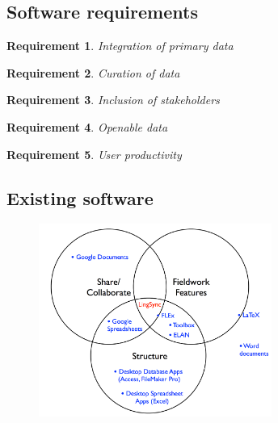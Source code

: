 \documentclass{beamer}
\newtheorem{requirement}{Requirement}
\begin{document}
\subsection[Requirements]{Software requirements}

\begin{frame}


\begin{requirement}
\label{req:primary-data}
Integration of primary data
\end{requirement}


\begin{requirement}
\label{req:curation}
Curation of data
\end{requirement}


\begin{requirement}
\label{req:inclusive}
Inclusion of stakeholders
\end{requirement}

\begin{requirement}
\label{req:openable}
Openable data
\end{requirement}


\begin{requirement}
\label{req:productivity}
User productivity
\end{requirement}
\end{frame}


\subsection{Existing software}

\begin{frame}


\begin{figure}
\begin{center}
\includegraphics[width=3in]{../figures/other_software_sets}
\label{othersoftware}
\end{center}
\end{figure}

\end{frame}
\end{document}
